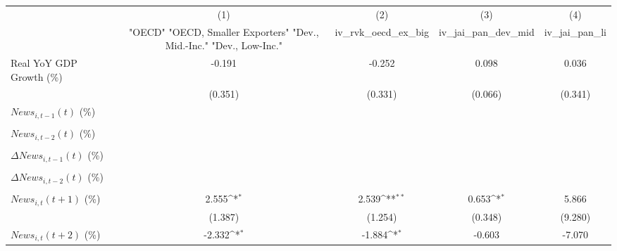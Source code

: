 {
\def\sym#1{\ifmmode^{#1}\else\(^{#1}\)\fi}
\begin{tabular}{l*{4}{c}}
\toprule
                    &\multicolumn{1}{c}{(1)}&\multicolumn{1}{c}{(2)}&\multicolumn{1}{c}{(3)}&\multicolumn{1}{c}{(4)}\\
                    &\multicolumn{1}{c}{ "OECD" "OECD, Smaller Exporters" "Dev., Mid.-Inc." "Dev., Low-Inc."}&\multicolumn{1}{c}{iv_rvk_oecd_ex_big}&\multicolumn{1}{c}{iv_jai_pan_dev_mid}&\multicolumn{1}{c}{iv_jai_pan_li}\\
\midrule
Real YoY GDP Growth (\%)&      -0.191         &      -0.252         &       0.098         &       0.036         \\
                    &     (0.351)         &     (0.331)         &     (0.066)         &     (0.341)         \\
\addlinespace
$ News_{i,t-1}(t)$ (\%)&                     &                     &                     &                     \\
                    &                     &                     &                     &                     \\
\addlinespace
$ News_{i,t-2}(t)$ (\%)&                     &                     &                     &                     \\
                    &                     &                     &                     &                     \\
\addlinespace
$ \Delta News_{i,t-1}(t)$ (\%)&                     &                     &                     &                     \\
                    &                     &                     &                     &                     \\
\addlinespace
$ \Delta News_{i,t-2}(t)$ (\%)&                     &                     &                     &                     \\
                    &                     &                     &                     &                     \\
\addlinespace
$ News_{i,t}(t+1)$ (\%)&       2.555\sym{*}  &       2.539\sym{**} &       0.653\sym{*}  &       5.866         \\
                    &     (1.387)         &     (1.254)         &     (0.348)         &     (9.280)         \\
\addlinespace
$ News_{i,t}(t+2)$ (\%)&      -2.332\sym{*}  &      -1.884\sym{*}  &      -0.603         &      -7.070         \\

\end{tabular}}
